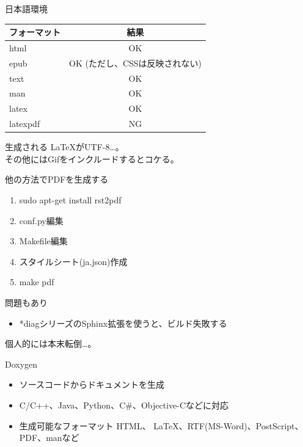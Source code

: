 \begin{frame}{日本語環境}
\begin{table}
 \begin{center}
{\scriptsize
  \begin{tabular}{|l|c|}
    \hline
    フォーマット & 結果 \\
    \hline
    html & OK \\
    epub & OK (ただし、CSSは反映されない)\\
    text & OK \\
    man & OK \\
    latex & OK \\
    latexpdf & NG \\
    \hline
  \end{tabular}
}
 \end{center}
\end{table}
生成される \LaTeX がUTF-8…。\\
その他にはGifをインクルードするとコケる。
\end{frame}

\begin{frame}{他の方法でPDFを生成する}
\begin{enumerate}
 \item sudo apt-get install rst2pdf
 \item conf.py編集
 \item Makefile編集
 \item スタイルシート(ja.json)作成
 \item make pdf
\end{enumerate}
\end{frame}

\begin{frame}{問題もあり}
 \begin{itemize}
  \item *diagシリーズのSphinx拡張を使うと、ビルド失敗する
 \end{itemize}
個人的には本末転倒…。
\end{frame}

\begin{frame}{Doxygen}
 \begin{itemize}
  \item ソースコードからドキュメントを生成
  \item C/C++、Java、Python、C\#、Objective-Cなどに対応
  \item 生成可能なフォーマット HTML、 \LaTeX 、RTF(MS-Word)、PostScript、PDF、manなど
 \end{itemize}
\end{frame}

